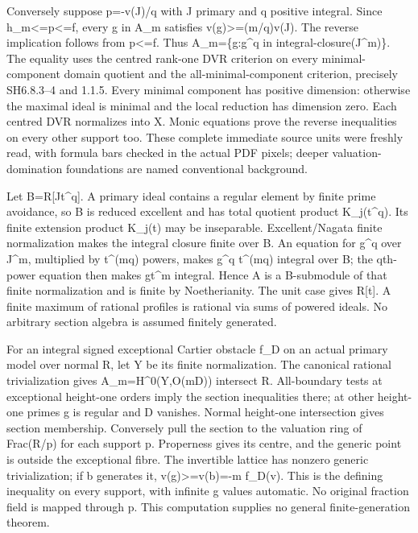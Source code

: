 \documentclass[11pt]{article}
\begin{document}
Conversely suppose p=-v(J)/q with J primary and q positive integral. Since h\_m\textless{}=p\textless{}=f, every g in A\_m satisfies v(g)\textgreater{}=(m/q)v(J). The reverse implication follows from p\textless{}=f. Thus A\_m=\{g:g\textasciicircum{}q in integral-closure(J\textasciicircum{}m)\}. The equality uses the centred rank-one DVR criterion on every minimal-component domain quotient and the all-minimal-component criterion, precisely SH6.8.3--4 and 1.1.5. Every minimal component has positive dimension: otherwise the maximal ideal is minimal and the local reduction has dimension zero. Each centred DVR normalizes into X. Monic equations prove the reverse inequalities on every other support too. These complete immediate source units were freshly read, with formula bars checked in the actual PDF pixels; deeper valuation-domination foundations are named conventional background.

Let B=R[Jt\textasciicircum{}q]. A primary ideal contains a regular element by finite prime avoidance, so B is reduced excellent and has total quotient product K\_j(t\textasciicircum{}q). Its finite extension product K\_j(t) may be inseparable. Excellent/Nagata finite normalization makes the integral closure finite over B. An equation for g\textasciicircum{}q over J\textasciicircum{}m, multiplied by t\textasciicircum{}(mq) powers, makes g\textasciicircum{}q t\textasciicircum{}(mq) integral over B; the qth-power equation then makes gt\textasciicircum{}m integral. Hence A is a B-submodule of that finite normalization and is finite by Noetherianity. The unit case gives R[t]. A finite maximum of rational profiles is rational via sums of powered ideals. No arbitrary section algebra is assumed finitely generated.

For an integral signed exceptional Cartier obstacle f\_D on an actual primary model over normal R, let Y be its finite normalization. The canonical rational trivialization gives A\_m=H\textasciicircum{}0(Y,O(mD)) intersect R. All-boundary tests at exceptional height-one orders imply the section inequalities there; at other height-one primes g is regular and D vanishes. Normal height-one intersection gives section membership. Conversely pull the section to the valuation ring of Frac(R/p) for each support p. Properness gives its centre, and the generic point is outside the exceptional fibre. The invertible lattice has nonzero generic trivialization; if b generates it, v(g)\textgreater{}=v(b)=-m f\_D(v). This is the defining inequality on every support, with infinite g values automatic. No original fraction field is mapped through p. This computation supplies no general finite-generation theorem.
\end{document}

